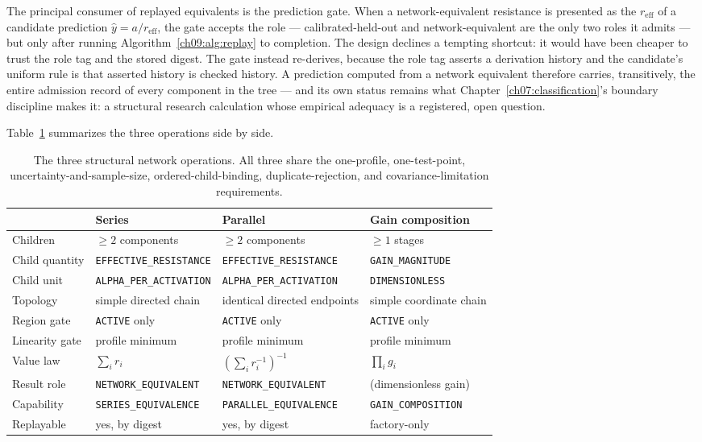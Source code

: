 The principal consumer of replayed equivalents is the prediction gate.
When a network-equivalent resistance is presented as the
$r_{\mathrm{eff}}$ of a candidate prediction $\hat y = a /
r_{\mathrm{eff}}$, the gate accepts the role --- calibrated-held-out and
network-equivalent are the only two roles it admits --- but only after
running Algorithm~\ref{ch09:alg:replay} to completion. The design
declines a tempting shortcut: it would have been cheaper to trust the
role tag and the stored digest. The gate instead re-derives, because the
role tag asserts a derivation history and the candidate's uniform rule
is that asserted history is checked history. A prediction computed from
a network equivalent therefore carries, transitively, the entire
admission record of every component in the tree --- and its own status
remains what Chapter~\ref{ch07:classification}'s boundary discipline
makes it: a structural research calculation whose empirical adequacy is
a registered, open question.

Table~\ref{ch09:tab:ops} summarizes the three operations side by side.

\begin{table}[htbp]
\centering
\small
\begin{tabular}{@{}llll@{}}
\toprule
 & Series & Parallel & Gain composition \\
\midrule
Children & $\ge 2$ components & $\ge 2$ components & $\ge 1$ stages \\
Child quantity & \texttt{EFFECTIVE\_RESISTANCE} & \texttt{EFFECTIVE\_RESISTANCE} & \texttt{GAIN\_MAGNITUDE} \\
Child unit & \texttt{ALPHA\_PER\_ACTIVATION} & \texttt{ALPHA\_PER\_ACTIVATION} & \texttt{DIMENSIONLESS} \\
Topology & simple directed chain & identical directed endpoints & simple coordinate chain \\
Region gate & \texttt{ACTIVE} only & \texttt{ACTIVE} only & \texttt{ACTIVE} only \\
Linearity gate & profile minimum & profile minimum & profile minimum \\
Value law & $\sum_i r_i$ & $(\sum_i r_i^{-1})^{-1}$ & $\prod_i g_i$ \\
Result role & \texttt{NETWORK\_EQUIVALENT} & \texttt{NETWORK\_EQUIVALENT} & (dimensionless gain) \\
Capability & \texttt{SERIES\_EQUIVALENCE} & \texttt{PARALLEL\_EQUIVALENCE} & \texttt{GAIN\_COMPOSITION} \\
Replayable & yes, by digest & yes, by digest & factory-only \\
\bottomrule
\end{tabular}
\caption{The three structural network operations. All three share the
one-profile, one-test-point, uncertainty-and-sample-size, ordered-child-binding,
duplicate-rejection, and covariance-limitation requirements.}
\label{ch09:tab:ops}
\end{table}

